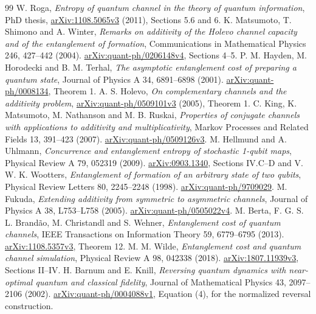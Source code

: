 \documentclass[11pt]{article}
\begin{document}
\begin{thebibliography}{99}
 W. Roga, \emph{Entropy of quantum channel in the theory of quantum information}, PhD thesis, \href{https://arxiv.org/abs/1108.5065v3}{arXiv:1108.5065v3} (2011), Sections 5.6 and 6.
 K. Matsumoto, T. Shimono and A. Winter, \emph{Remarks on additivity of the Holevo channel capacity and of the entanglement of formation}, Communications in Mathematical Physics 246, 427--442 (2004). \href{https://arxiv.org/abs/quant-ph/0206148}{arXiv:quant-ph/0206148v4}, Sections 4--5.
 P. M. Hayden, M. Horodecki and B. M. Terhal, \emph{The asymptotic entanglement cost of preparing a quantum state}, Journal of Physics A 34, 6891--6898 (2001). \href{https://arxiv.org/abs/quant-ph/0008134}{arXiv:quant-ph/0008134}, Theorem 1.
 A. S. Holevo, \emph{On complementary channels and the additivity problem}, \href{https://arxiv.org/abs/quant-ph/0509101v3}{arXiv:quant-ph/0509101v3} (2005), Theorem 1.
 C. King, K. Matsumoto, M. Nathanson and M. B. Ruskai, \emph{Properties of conjugate channels with applications to additivity and multiplicativity}, Markov Processes and Related Fields 13, 391--423 (2007). \href{https://arxiv.org/abs/quant-ph/0509126v3}{arXiv:quant-ph/0509126v3}.
 M. Hellmund and A. Uhlmann, \emph{Concurrence and entanglement entropy of stochastic 1-qubit maps}, Physical Review A 79, 052319 (2009). \href{https://arxiv.org/abs/0903.1340}{arXiv:0903.1340}, Sections IV.C--D and V.
 W. K. Wootters, \emph{Entanglement of formation of an arbitrary state of two qubits}, Physical Review Letters 80, 2245--2248 (1998). \href{https://arxiv.org/abs/quant-ph/9709029}{arXiv:quant-ph/9709029}.
 M. Fukuda, \emph{Extending additivity from symmetric to asymmetric channels}, Journal of Physics A 38, L753--L758 (2005). \href{https://arxiv.org/abs/quant-ph/0505022}{arXiv:quant-ph/0505022v4}.
 M. Berta, F. G. S. L. Brand\~ao, M. Christandl and S. Wehner, \emph{Entanglement cost of quantum channels}, IEEE Transactions on Information Theory 59, 6779--6795 (2013). \href{https://arxiv.org/abs/1108.5357v3}{arXiv:1108.5357v3}, Theorem 12.
 M. M. Wilde, \emph{Entanglement cost and quantum channel simulation}, Physical Review A 98, 042338 (2018). \href{https://arxiv.org/abs/1807.11939v3}{arXiv:1807.11939v3}, Sections II--IV.
 H. Barnum and E. Knill, \emph{Reversing quantum dynamics with near-optimal quantum and classical fidelity}, Journal of Mathematical Physics 43, 2097--2106 (2002). \href{https://arxiv.org/abs/quant-ph/0004088v1}{arXiv:quant-ph/0004088v1}, Equation (4), for the normalized reversal construction.
\end{thebibliography}
\end{document}
